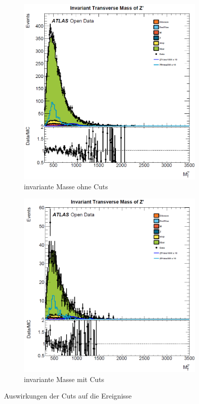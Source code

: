 \begin{figure}[h]
\begin{subfigure}{.5\textwidth}
\centering
\includegraphics[width=.8\linewidth]{../Pictures/Auswertung/mass_before.png}
\caption{invariante Masse ohne Cuts}
\end{subfigure}%
\begin{subfigure}{.5\textwidth}
\centering
\includegraphics[width=.8\linewidth]{../Pictures/Auswertung/mass_after.png}
\caption{invariante Masse mit Cuts}
\end{subfigure}%
\caption{Auswirkungen der Cuts auf die Ereignisse }
\label{Cuts_z}
\end{figure}

